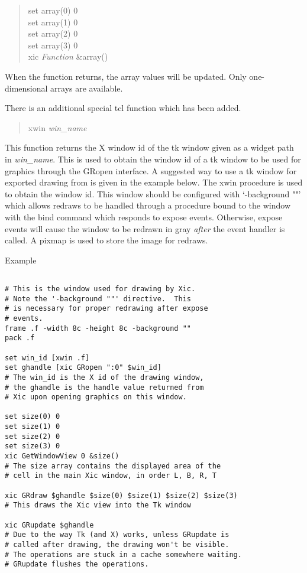 \begin{itemize}
\begin{quote}\vt
set array(0) 0\\
set array(1) 0\\
set array(2) 0\\
set array(3) 0\\
xic {\it Function} \&array()
\end{quote}

When the function returns, the array values will be updated.  Only
one-dimensional arrays are available.

There is an additional special {\et tcl} function which has been added.
\begin{quote}
{\vt xwin} {\it win\_name}
\end{quote}
This function returns the X window id of the {\et tk} window given as
a widget path in {\it win\_name}.  This is used to obtain the window
id of a {\et tk} window to be used for {\Xic} graphics through the
{\vt GRopen} interface.  A suggested way to use a {\et tk} window for
exported drawing from {\Xic} is given in the example below.  The {\vt
xwin} procedure is used to obtain the window id.  This window should
be configured with `{\vt -background ""}' which allows redraws to be
handled through a procedure bound to the window with the {\vt bind}
command which responds to expose events.  Otherwise, expose events
will cause the window to be redrawn in gray {\it after} the event
handler is called.  A pixmap is used to store the image for redraws.

Example

\begin{verbatim}

# This is the window used for drawing by Xic.
# Note the '-background ""' directive.  This
# is necessary for proper redrawing after expose
# events.
frame .f -width 8c -height 8c -background ""
pack .f

set win_id [xwin .f]
set ghandle [xic GRopen ":0" $win_id]
# The win_id is the X id of the drawing window,
# the ghandle is the handle value returned from
# Xic upon opening graphics on this window.

set size(0) 0
set size(1) 0
set size(2) 0
set size(3) 0
xic GetWindowView 0 &size()
# The size array contains the displayed area of the
# cell in the main Xic window, in order L, B, R, T

xic GRdraw $ghandle $size(0) $size(1) $size(2) $size(3)
# This draws the Xic view into the Tk window

xic GRupdate $ghandle
# Due to the way Tk (and X) works, unless GRupdate is
# called after drawing, the drawing won't be visible.
# The operations are stuck in a cache somewhere waiting.
# GRupdate flushes the operations.


\end{verbatim}
\end{itemize}
